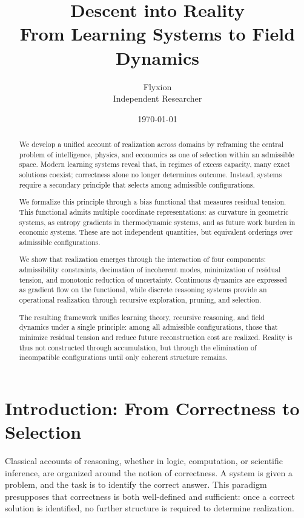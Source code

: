 \documentclass[11pt]{article}
\title{\textbf{Descent into Reality}\\
\large From Learning Systems to Field Dynamics}
\author{Flyxion\\[0.4em]\small Independent Researcher}
\date{\today}
\theoremstyle{plain}
\theoremstyle{definition}
\theoremstyle{remark}
\begin{document}
\maketitle

\begin{abstract}
We develop a unified account of realization across domains by reframing the central problem of intelligence, physics, and economics as one of selection within an admissible space. Modern learning systems reveal that, in regimes of excess capacity, many exact solutions coexist; correctness alone no longer determines outcome. Instead, systems require a secondary principle that selects among admissible configurations.

We formalize this principle through a bias functional that measures residual tension. This functional admits multiple coordinate representations: as curvature in geometric systems, as entropy gradients in thermodynamic systems, and as future work burden in economic systems. These are not independent quantities, but equivalent orderings over admissible configurations.

We show that realization emerges through the interaction of four components: admissibility constraints, decimation of incoherent modes, minimization of residual tension, and monotonic reduction of uncertainty. Continuous dynamics are expressed as gradient flow on the functional, while discrete reasoning systems provide an operational realization through recursive exploration, pruning, and selection.

The resulting framework unifies learning theory, recursive reasoning, and field dynamics under a single principle: among all admissible configurations, those that minimize residual tension and reduce future reconstruction cost are realized. Reality is thus not constructed through accumulation, but through the elimination of incompatible configurations until only coherent structure remains.
\end{abstract}

\newpage

\section{Introduction: From Correctness to Selection}

Classical accounts of reasoning, whether in logic, computation, or scientific inference, are organized around the notion of correctness. A system is given a problem, and the task is to identify the correct answer. This paradigm presupposes that correctness is both well-defined and sufficient: once a correct solution is identified, no further structure is required to determine realization.
\end{document}
